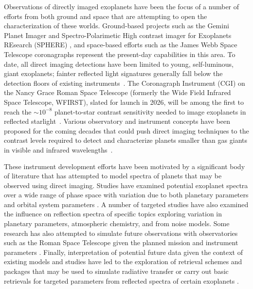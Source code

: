 \documentclass[12pt, letterpaper]{aastex631}
\begin{document}
Observations of directly imaged exoplanets have been the focus of a number of efforts from both ground and space that are attempting to open the characterization of these worlds. Ground-based projects such as the Gemini Planet Imager \citep{2014PNAS..11112661M} and Spectro-Polarimetic High contrast imager for Exoplanets REsearch (SPHERE) \citep{2019A&A...631A.155B}, and space-based efforts such as the James Webb Space Telescope coronagraphs \citep{Krist2007SPIE, 2015PASP..127..633B} represent the present-day capabilities in this area. To date, all direct imaging detections have been limited to young, self-luminous, giant exoplanets; fainter reflected light signatures generally fall below the detection floors of existing instruments~\citep{Guyon2005ApJ}. The Coronagraph Instrument (CGI) on the Nancy Grace Roman Space Telescope (formerly the Wide Field Infrared Space Telescope, WFIRST), slated for launch in 2026, will be among the first to reach the $\sim10^{-8}$ planet-to-star contrast sensitivity needed to image exoplanets in reflected starlight~\citep{Traub2016JATIS, Mennesson2020arXiv}. Various observatory and instrument concepts have been proposed for the coming decades that could push direct imaging techniques to the contrast levels required to detect and characterize planets smaller than gas giants in visible and infrared wavelengths~\citep{2015IJAsB..14..279Q, 2006SPIE.6267E..2AA, 2018SPIE10702E..A5S, 10.1117/12.2240457, 2019arXiv191206219T}. 

These instrument development efforts have been motivated by a significant body of literature that has attempted to model spectra of planets that may be observed using direct imaging.  Studies have examined potential exoplanet spectra over a wide range of phase space with variation due to both planetary parameters and orbital system parameters \citep{2000ApJ...538..885S, 2004ApJ...609..407B, 2010ApJ...724..189C}.  A number of targeted studies have also examined the influence on reflection spectra of specific topics exploring variation in planetary parameters, atmospheric chemistry, and from noise models.  Some research has also attempted to simulate future observations with observatories such as the Roman Space Telescope \citep{2017SPIE10400E..0BR, 2019AJ....157..132L} given the planned mission and instrument parameters \citep{2017SPIE10400E..1PS, 2018SPIE10698E..2IM}. Finally, interpretation of potential future data given the context of existing models and studies have led to the exploration of retrieval schemes \citep{2016AJ....152..217L} and packages that may be used to simulate radiative transfer \citep{2019ApJ...878...70B} or carry out basic retrievals for targeted parameters from reflected spectra of certain exoplanets \citep{2020AJ....159..175D}. 
\end{document}
